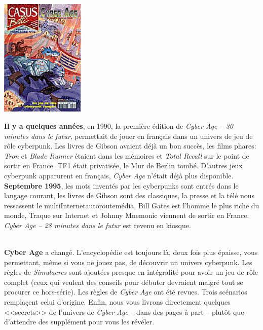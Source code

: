 \documentclass[11pt,twoside,a4paper]{article}
\begin{document}
\begin{minipage}[ht]{4.50cm}
	\includegraphics[width=4.00cm]{img/CouvCA.png}
\end{minipage} \hfill \begin{minipage}[ht]{14.50cm}
\textbf{Il y a quelques ann{\'e}es}, en 1990, la premi{\`e}re {\'e}dition de \emph{Cyber Age -- 30 minutes dans le futur}, permettait de jouer en fran\c{c}ais dans un univers de jeu de r{\^o}le cyberpunk. Les livres de Gibson avaient d{\'e}j{\`a} un bon succ{\`e}s, les films phares: \emph{Tron} et \emph{Blade Runner} {\'e}taient dans les m{\'e}moires et \emph{Total Recall} sur le point de sortir en France. TF1 {\'e}tait privatis{\'e}e, le Mur de Berlin tomb{\'e}. D'autres jeux cyberpunk apparurent en fran\c{c}ais, \emph{Cyber Age} n'{\'e}tait d{\'e}j{\`a} plus disponible.~\\

\textbf{Septembre 1995}, les mots invent{\'e}s par les cyberpunks sont entr{\'e}s dans le langage courant, les livres de Gibson sont des classiques, la presse et la t{\'e}l{\'e} nous ressassent le multiInternetautoroutem{\'e}dia, Bill Gates est l'homme le plus riche du monde, Traque sur Internet et Johnny Mnemonic viennent de sortir en France. \emph{Cyber Age -- 28 minutes dans le futur} est revenu en kiosque.~\\
\end{minipage}~\\

\textbf{Cyber Age} a chang{\'e}. L'encyclop{\'e}die est toujours l{\`a}, deux fois plus {\'e}paisse, vous permettant, m{\^e}me si vous ne jouez pas, de d{\'e}couvrir un univers cyberpunk. Les r{\`e}gles de \emph{Simulacres} sont ajout{\'e}es presque en int{\'e}gralit{\'e} pour avoir un jeu de r{\^o}le complet (ceux qui veulent des conseils pour d{\'e}buter devraient malgr{\'e} tout se procurer ce hors-s{\'e}rie). Les r{\`e}gles de \emph{Cyber Age} ont {\'e}t{\'e} revues. Trois sc{\'e}narios rempla\c{c}ent celui d'origine. Enfin, nous vous livrons directement quelques <<secrets>> de l'univers de \emph{Cyber Age} -- dans des pages {\`a} part -- plut{\^o}t que d'attendre des suppl{\'e}ment pour vous les r{\'e}v{\'e}ler.~\\
\end{document}
